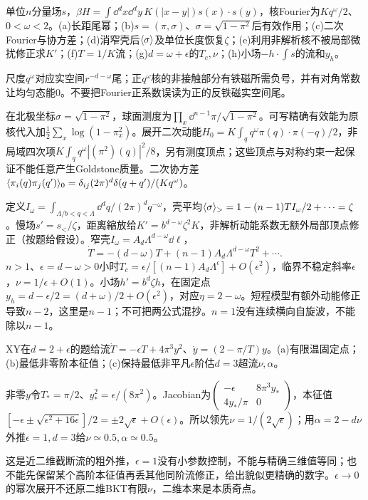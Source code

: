 \begin{exercise}[原题1(a)--(h)]\label{p:334-6-1}
单位$n$分量场$s$，$\beta H=\int\dd^dx\dd^dy\,K(|x-y|)s(x)\cdot s(y)$，核Fourier为$Kq^\omega/2$、$0<\omega<2$。(a)长距尾幂；(b)$s=(\pi,\sigma)$、$\sigma=\sqrt{1-\pi^2}$后有效作用；(c)二次Fourier与协方差；(d)消窄壳后$\langle \sigma\rangle$及单位长度恢复$\zeta$；(e)利用非解析核不被局部微扰修正求$K'$；(f)$T=1/K$流；(g)$d=\omega+\epsilon$的$T_c,\nu$；(h)小场$-h\cdot\int s$的流和$y_h$。
\end{exercise}
\begin{solution}
尺度$q^\omega$对应实空间$r^{-d-\omega}$尾；正$q^\omega$核的非接触部分有铁磁所需负号，并有对角常数让均匀态能0。不要把Fourier正系数误读为正的反铁磁实空间尾。

在北极坐标$\sigma=\sqrt{1-\pi^2}$，球面测度为$\prod_x\dd^{n-1}\pi/\sqrt{1-\pi^2}$。可写精确有效能为原核代入加$\tfrac12\sum_x\log(1-\pi_x^2)$。展开二次动能$H_0=K\int_q q^\omega\pi(q)\cdot\pi(-q)/2$，非局域四次项$K\int_q q^\omega|(\pi^2)(q)|^2/8$，另有测度顶点；这些顶点与对称约束一起保证不能任意产生Goldstone质量。二次协方差$\langle \pi_i(q)\pi_j(q')\rangle_0=\delta_{ij}(2\pi)^d\delta(q+q')/(Kq^\omega)$。

定义$I_\omega=\int_{\Lambda/b<q<\Lambda}\dd^dq/(2\pi)^dq^{-\omega}$，壳平均$\langle \sigma\rangle_>=1-(n-1)TI_\omega/2+\cdots=\zeta$。慢场$s'=s_</\zeta$，距离縮放给$K'=b^{d-\omega}\zeta^2K$，非解析动能系数无额外局部顶点修正（按题给假设）。窄壳$I_\omega=A_d\Lambda^{d-\omega}\dd\ell$，
\begin{equation}
\dot T=-(d-\omega)T+(n-1)A_d\Lambda^{d-\omega}T^2+\cdots.
\end{equation}
$n>1$、$\epsilon=d-\omega>0$小时$T_c=\epsilon/[(n-1)A_d\Lambda^\epsilon]+O(\epsilon^2)$，临界不稳定斜率$\epsilon$，$\nu=1/\epsilon+O(1)$。小场$h'=b^d\zeta h$，在固定点$y_h=d-\epsilon/2=(d+\omega)/2+O(\epsilon^2)$，对应$\eta=2-\omega$。短程模型有额外动能修正导致$n-2$，这里是$n-1$；不可把两公式混抄。$n=1$没有连续横向自旋波，不能除以$n-1$。
\end{solution}
\begin{exercise}[原题2(a)--(c)]\label{p:334-6-2}
XY在$d=2+\epsilon$的题给流$\dot T=-\epsilon T+4\pi^3y^2$、$\dot y=(2-\pi/T)y$。(a)有限温固定点；(b)最低非零阶本征值；(c)保持最低非平凡$\epsilon$阶估$d=3$超流$\nu,\alpha$。
\end{exercise}
\begin{solution}
非零$y$令$T_* =\pi/2$、$y_*^2=\epsilon/(8\pi^2)$。Jacobian为$\left(\begin{smallmatrix}-\epsilon&8\pi^3y_*\\4y_*/\pi&0\end{smallmatrix}\right)$，本征值$[-\epsilon\pm\sqrt{\epsilon^2+16\epsilon}]/2=\pm2\sqrt\epsilon+O(\epsilon)$。所以领先$\nu=1/(2\sqrt\epsilon)$；用$\alpha=2-d\nu$外推$\epsilon=1,d=3$给$\nu\simeq0.5,\alpha\simeq0.5$。

这是近二维截断流的粗外推，$\epsilon=1$没有小参数控制，不能与精确三维值等同；也不能先保留某个高阶本征值再丢其他同阶流修正，给出貌似更精确的数字。$\epsilon\to0$的幂次展开不还原二维BKT有限$\nu$，二维本来是本质奇点。
\end{solution}
